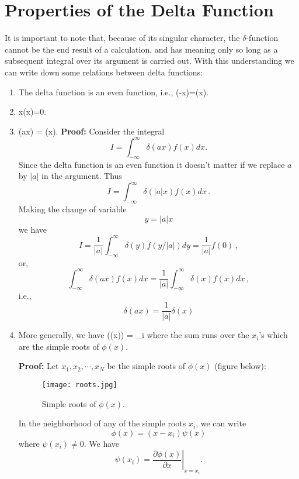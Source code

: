 \section{Properties of the Delta Function}
It is important to note that, because of its singular character, the $\delta$-function cannot be the end result of a calculation,
and has meaning only so long as a subsequent integral over its argument is carried out. With this understanding we can write
down some relations between delta functions:
\begin{enumerate}
\item
The delta function is an even function, i.e.,
\be
\delta(-x)=\delta(x).
\ee

\item
\be
x\delta(x)=0.
\ee

\item
\be
\delta(ax) =  \delta(x).
\ee
{\bf Proof:}\newline
Consider the integral
\[
I=\int_{-\infty}^{\infty}\delta(ax)f(x)dx. 
\]
Since the delta function is an even function it doesn't matter if we replace $a$ by $|a|$ in the argument. Thus
\[ I= \int_{-\infty}^{\infty} \delta(|a|x)f(x) dx \, . \]
Making the change of variable
\[ y=|a|x \]
we have
\[ I= \frac{1}{|a|} \int_{-\infty}^{\infty} \delta(y)f(y/|a|) dy= \frac{1}{|a|} f(0) \, , \]
or,
\[ \int_{-\infty}^{\infty} \delta(ax)f(x) dx  = \frac{1}{|a|} \int_{-\infty}^{\infty} \delta(x)f(x) dx \, , \]
i.e.,
\begin{equation*}
\boxed{
\delta(ax)=\frac{1}{|a|}\delta(x)
}
\end{equation*}

\item
More generally, we have
\be
\delta(\phi(x)) = \sum_i 
\ee
where the sum runs over the $x_i$'s which are the simple roots of $\phi(x)$.

\noindent
{\bf Proof:}\newline
Let $x_1, x_2, \cdots , x_N$ be the simple roots of $\phi(x)$ (figure below):
\begin{figure}[ht]
\centering
\texttt{[image: roots.jpg]}
\caption{Simple roots of $\phi(x)$.}
\end{figure}

\noindent
In the neighborhood of any of the simple roots $x_i$, we can write
\[ \phi(x) = (x-x_i)\psi(x) \]
where $\psi(x_i) \neq 0$. We have
\[ \psi(x_i) = \left. \frac{\partial \phi(x)}{\partial x}\right|_{x=x_i}. \]


\end{enumerate}
